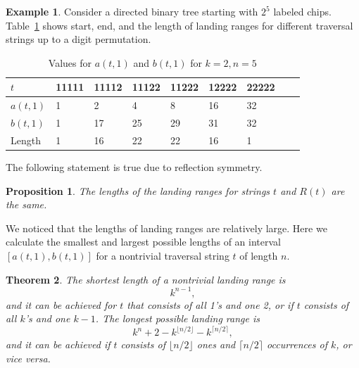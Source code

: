 \documentclass[11pt]{article}
\newtheorem{theorem}{Theorem}[section] %
\newtheorem{proposition}[theorem]{Proposition}
\theoremstyle{definition}
\newtheorem{example}{Example}
\theoremstyle{remark}
\begin{document}
\begin{example}\label{ex:2and5}
Consider a directed binary tree starting with $2^5$ labeled chips. Table~\ref{tab:ranges2-5} shows start, end, and the length of landing ranges for different traversal strings up to a digit permutation.

\begin{table}[h!]\caption{Values for $a(t, 1)$ and $b(t, 1)$ for $k=2, n=5$ \label{tab:SecondThing}}
\centering
\begin{tabular}{|l|l|l|l|l|l|l|l|l|}
\hline
$t$       & 11111 & 11112 & 11122 & 11222 & 12222 & 22222 \\ \hline
$a(t,1)$ & 1 & 2 & 4 & 8 & 16 & 32 \\ \hline
$b(t,1)$ & 1 & 17 & 25& 29& 31& 32\\ \hline
Length & 1 & 16 & 22& 22& 16 & 1 \\ \hline
\end{tabular}
\label{tab:ranges2-5}
\end{table}
\end{example}

The following statement is true due to reflection symmetry.
\begin{proposition}\label{prop:Reflection}
    The lengths of the landing ranges for strings $t$ and $R(t)$ are the same.
\end{proposition}

We noticed that the lengths of landing ranges are relatively large. Here we calculate the smallest and largest possible lengths of an interval $[a(t, 1),b(t, 1)]$ for a nontrivial traversal string $t$ of length $n$.

\begin{theorem}
    The shortest length of a nontrivial landing range is 
    \[k^{n-1},\]
    and it can be achieved for $t$ that consists of all 1's and one 2, or if $t$ consists of all $k$'s and one $k-1$. 
    The longest possible landing range is
    \[k^n+2-k^{\lfloor n/2 \rfloor} -k^{\lceil n/2 \rceil},\]
    and it can be achieved if $t$ consists of $\lfloor n/2 \rfloor$ ones and $\lceil n/2 \rceil$ occurrences of $k$, or vice versa.
\end{theorem}
\end{document}
